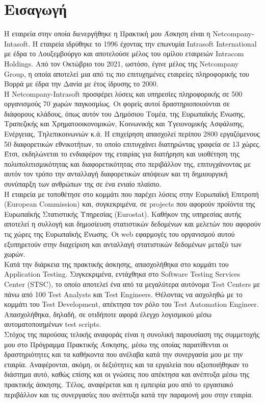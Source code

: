\setcounter{chapter}{0}
\chapter{Εισαγωγή}

Η εταιρεία στην οποία διενεργήθηκε η Πρακτική μου Άσκηση είναι η Netcompany-Intasoft. Η εταιρεία ιδρύθηκε το 1996 έχοντας την επωνυμία Intrasoft International με έδρα το Λουξεμβούργο και αποτελούσε μέλος του 
ομίλου εταιρειών Intracom Holdings. Από τον Οκτώβριο του 2021, ωστόσο, έγινε μέλος της Netcompany Group, η οποία αποτελεί μια από τις πιο επιτυχημένες εταιρείες πληροφορικής του Βορρά με έδρα την Δανία με έτος 
ίδρυσης το 2000.\\

Η Netcompany-Intrasoft προσφέρει λύσεις και υπηρεσίες πληροφορικής σε 500 οργανισμούς 70 χωρών παγκοσμίως. Οι φορείς αυτοί δραστηριοποιούνται σε διάφορους κλάδους, όπως αυτόν του Δημόσιου Τομέα, της Ευρωπαϊκής 
Ένωσης, Τραπεζικής και Χρηματοοικονομικών, Κοινωνικής και Υγειονομικής Ασφάλισης, Ενέργειας, Τηλεπικοινωνιών κ.ά. Η επιχείρηση απασχολεί περίπου 2800 εργαζόμενους 50 διαφορετικών εθνικοτήτων, το οποίο επιτυγχάνει 
διατηρώντας γραφεία σε 13 χώρες. Έτσι, εκδηλώνεται το ενδιαφέρον της εταιρίας για διατήρηση και υιοθέτηση της πολυπολιτισμικότητας και διαφορετικότητας στο περιβάλλον της, επιτυγχάνοντας με αυτόν τον τρόπο την 
ανταλλαγή διαφορετικών απόψεων και τη δημιουργική συνύπαρξη των ανθρώπων της σε ένα ενιαίο πλαίσιο.\\

Η εταιρεία με τοποθέτησε στο κομμάτι που παρέχει λύσεις στην Ευρωπαϊκή Επιτροπή (European Commission) και, συγκεκριμένα, σε projects που αφορούν προϊόντα της Ευρωπαϊκής Στατιστικής Υπηρεσίας (Eurostat). Καθήκον 
της υπηρεσίας αυτής αποτελεί η συλλογή και δημοσίευση στατιστικών δεδομένων και μελετών που αφορούν τις χώρες της Ευρωπαϊκής Ένωσης. Οι web εφαρμογές του οργανισμού αυτού εξυπηρετούν στην διαχείριση και ανταλλαγή 
στατιστικών δεδομένων μεταξύ των χωρών.\\

Κατά την διάρκεια της πρακτικής άσκησης, απασχολήθηκα στο κομμάτι του Application Testing. Συγκεκριμένα, εντάχθηκα στο Software Testing Services Center (STSC), το οποίο αποτελεί ένα από τα μεγαλύτερα αυτόνομα 
Test Centers με πάνω από 100 Test Analysts και Test Engineers. Θέλοντας να ασχοληθώ με το κομμάτι του Test Development, απέκτησα τον ρόλο του Test Automation Engineer. Απασχολήθηκα, δηλαδή, σε οτιδήποτε αφορά 
έλεγχο λογισμικού μέσω αυτοματοποιημένων test scripts.\\

Στόχος της παρούσας τελικής αναφοράς είναι η συνολική παρουσίαση της συμμετοχής μου στο Πρόγραμμα Πρακτικής Άσκησης, μέσω της οποίας παρατίθενται οι δραστηριότητες και τα καθήκοντα που ανέλαβα κατά την συνεργασία 
μου με την εταιρία. Αναφέρονται, ακόμη, οι δεξιότητες και τα εργαλεία που αξιοποιήθηκαν το διάστημα αυτό, καθώς επίσης και οι γνώσεις που απέκτησα και ανέπτυξα μέσω της πρακτικής άσκησης. Τέλος, αναφέρεται και η 
εμπειρία μου από το εργασιακό περιβάλλον και τις συνεργασίες που ανέπτυξα κατά την παραμονή μου στην εταιρία.